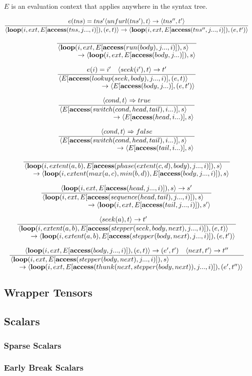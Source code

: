 $E$ is an evaluation context that applies anywhere in the syntax tree.

\[
\frac{e(tns) = tns' \langle unfurl(tns'), t\rangle \rightarrow \langle tns'', t'\rangle}
{\langle \text{\textbf{loop}}(i, ext, E[\text{\textbf{access}}(tns, j..., i)]), (e, t)\rangle \rightarrow \langle \text{\textbf{loop}}(i, ext, E[\text{\textbf{access}}(tns'', j..., i)]), (e, t')\rangle}
\]

\[
\frac{}
{\splitfrac{\langle \finchloop(i, ext, E[\finchaccess(run(body), j..., i)]), s\rangle
    }{\rightarrow \langle \finchloop(i, ext, E[\finchaccess(body, j...)]), s\rangle}}
\]

\[
\frac{e(i) = i' \quad \langle seek(i'), t \rangle \rightarrow t'}
{\splitfrac{\langle E[\finchaccess(lookup(seek, body), j..., i)], (e, t)\rangle
    }{\rightarrow \langle E[\finchaccess(body, j...)], (e, t')\rangle}}
\]

\[
\frac{\langle cond, t \rangle \Rightarrow true}
{\splitfrac{\langle E[\finchaccess(switch(cond, head, tail), i...)], s\rangle
    }{\rightarrow \langle E[\finchaccess(head, i...)], s\rangle}}
\]

\[
\frac{\langle cond, t \rangle \Rightarrow false}
{\splitfrac{\langle E[\finchaccess(switch(cond, head, tail), i...)], s\rangle
    }{\rightarrow \langle E[\finchaccess(tail, i...)], s\rangle}}
\]

\[
\frac{}
{\splitfrac{\langle \finchloop(i, extent(a, b), E[\finchaccess(phase(extent(c, d), body), j..., i)]), s\rangle
    }{\rightarrow \langle \finchloop(i, extent(max(a, c), min(b, d)), E[\finchaccess(body, j..., i)]), s\rangle}}
\]

\[
\frac{\langle \finchloop(i, ext, E[\finchaccess(head, j..., i)]), s\rangle \rightarrow s'}
{\splitfrac{\langle \finchloop(i, ext, E[\finchaccess(sequence(head, tail), j..., i)]), s\rangle
    }{\rightarrow \langle \finchloop(i, ext, E[\finchaccess(tail, j..., i)]), s'\rangle}}
\]

\[
\frac{\langle seek(a), t \rangle \rightarrow t' \quad }
{\splitfrac{\langle \finchloop(i, extent(a, b), E[\finchaccess(stepper(seek, body, next), j..., i)]), (e, t)\rangle
    }{\rightarrow \langle \finchloop(i, extent(a, b), E[\finchaccess(stepper(body, next), j..., i)]), (e, t')\rangle}}
\]

\[
\frac{\langle \finchloop(i, ext, E[\finchaccess(body, j..., i)]), (e, t) \rangle \rightarrow (e', t') \quad \langle next, t' \rangle \rightarrow t''}
{\splitfrac{\langle \finchloop(i, ext, E[\finchaccess(stepper(body, next), j..., i)]), s\rangle
    }{\rightarrow \langle \finchloop(i, ext, E[\finchaccess(thunk(next, stepper(body, next)), j..., i)]), (e', t'')\rangle}}
\]


\subsection{Wrapper Tensors}

\subsection{Scalars}

\subsubsection{Sparse Scalars}
\subsubsection{Early Break Scalars}

